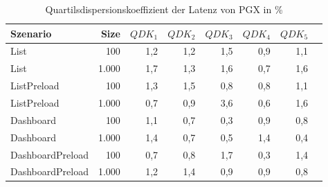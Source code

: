 
\begin{table}[ht]
\setlength{\extrarowheight}{-1pt}
\centering
\caption{Quartilsdispersionskoeffizient der Latenz von PGX in \%}
\begin{tabular}{lrrrrrrr}
\toprule
Szenario & Size & ${QDK_1}$ & ${QDK_2}$ & ${QDK_3}$& ${QDK_4}$ & ${QDK_5}$ \\
\midrule
	List & 100 & \cellcolor{red!2}  1,2 & \cellcolor{red!2}  1,2 & \cellcolor{red!2}  1,5 & \cellcolor{red!1}  0,9 & \cellcolor{red!2}  1,1 \\
	List & 1.000 & \cellcolor{red!2}  1,7 & \cellcolor{red!2}  1,3 & \cellcolor{red!2}  1,6 & \cellcolor{red!1}  0,7 & \cellcolor{red!2}  1,6 \\
	ListPreload & 100 & \cellcolor{red!2}  1,3 & \cellcolor{red!2}  1,5 & \cellcolor{red!1}  0,8 & \cellcolor{red!1}  0,8 & \cellcolor{red!2}  1,1 \\
	ListPreload & 1.000 & \cellcolor{red!1}  0,7 & \cellcolor{red!1}  0,9 & \cellcolor{red!4}  3,6 & \cellcolor{red!1}  0,6 & \cellcolor{red!2}  1,6 \\
	Dashboard & 100 & \cellcolor{red!2}  1,1 & \cellcolor{red!1}  0,7 & \cellcolor{red!1}  0,3 & \cellcolor{red!1}  0,9 & \cellcolor{red!1}  0,8 \\
	Dashboard & 1.000 & \cellcolor{red!2}  1,4 & \cellcolor{red!1}  0,7 & \cellcolor{red!1}  0,5 & \cellcolor{red!2}  1,4 & \cellcolor{red!1}  0,4 \\
	DashboardPreload & 100 & \cellcolor{red!1}  0,7 & \cellcolor{red!1}  0,8 & \cellcolor{red!2}  1,7 & \cellcolor{red!1}  0,3 & \cellcolor{red!2}  1,4 \\
	DashboardPreload & 1.000 & \cellcolor{red!2}  1,2 & \cellcolor{red!2}  1,4 & \cellcolor{red!1}  0,9 & \cellcolor{red!1}  0,9 & \cellcolor{red!1}  0,8 \\
\bottomrule
\end{tabular}
\label{tab:quartilsdispersionskoeffizient_latenz_pgx}
\end{table}
	